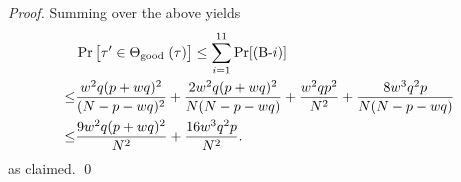 \begin{proof}
%
%
%


%
%


\arrangespace


Summing over the above yields
%
\begin{align*}
&  \Pr\big[ \tau' \in \Theta_{\text {good }}(\tau)\big]  \leq \sum_{i=1}^{11}\Pr[\text{(B-}i)]       \\
\leq  & \frac{w^2 q (p+w q)^{2}}{(N-p-wq)^{2}}+
\frac{2w^2 q (p+w q)^{2}}{N  (N-p-wq)}+
\frac{w^2qp^2}{N^2}+
\frac{8w^3q^2p}{N(N-p-wq)}      \\
\leq  & \frac{9w^2 q (p+w q)^{2}}{N^2}+ \frac{16w^3q^2p}{N^2} .
\end{align*}
%
as claimed.        \qed
\end{proof}
